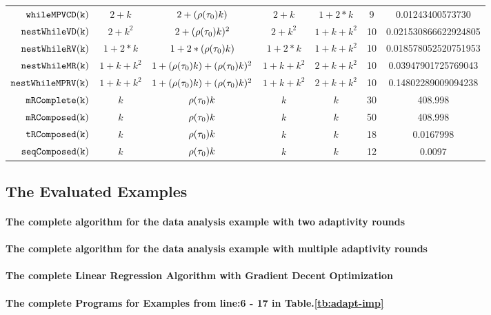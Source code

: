 \begin {table}[H]
\begin{center}
{\begin{tabular}{ r | c | c | c | c | c | c }
         $  \mathtt{whileMPVCD(k)}$ & $2 + k$ & $2 + (\rho(\mathtt{\tau}_0) k)$  & $2 + k$ & $1 + 2 * k$   &   9 & 0.01243400573730 \\
         $  \mathtt{nestWhileVD(k)}$ & $2 + k^2$ & $2 + (\rho(\mathtt{\tau}_0) k)^2$  & $2 + k^2$ & $1 + k + k^2$   &  10 & 0.021530866622924805  \\
         $  \mathtt{nestWhileRV(k)}$ & $1 + 2*k$ & $1 + 2*(\rho(\mathtt{\tau}_0) k)$ & $1 + 2*k$ &  $1 + k + k^2$   &  10 & 0.018578052520751953  \\
         $  \mathtt{nestWhileMR(k)}$ & $1 + k + k^2$ & $1 + (\rho(\mathtt{\tau}_0) k) + (\rho(\mathtt{\tau}_0) k)^2$  & $1 + k + k^2$ &  $2 + k + k^2$  & 10 & 0.03947901725769043  \\
         $  \mathtt{nestWhileMPRV(k)}$ & $1 + k + k^2$ & $1 + (\rho(\mathtt{\tau}_0) k) + (\rho(\mathtt{\tau}_0) k)^2$  & $1 + k + k^2$ &  $2 + k + k^2$  &  10 & 0.14802289009094238  \\
         $  \mathtt{mRComplete(k)}$ & $k$ & $ \rho(\mathtt{\tau}_0) k $ & $k$ & $k$   &  30 & 408.998 \\
         $  \mathtt{mRComposed(k)}$ & $k$ & $ \rho(\mathtt{\tau}_0) k $ & $k$ & $k$   &  50 & 408.998 \\
         $  \mathtt{tRComposed(k)}$ & $k$ & $ \rho(\mathtt{\tau}_0) k $ & $k$ & $k$  &  18 & 0.0167998 \\
         $  \mathtt{seqComposed(k)}$ & $k$ & $ \rho(\mathtt{\tau}_0) k $ & $k$ & $k$  &  12 & 0.0097
        \end{tabular}
}        
\end{center}
\end{table}
%
 \subsection{The Evaluated Examples}  
 \paragraph{The complete algorithm for the data analysis example with two adaptivity rounds} 
 
 \paragraph{The complete algorithm for the data analysis example with multiple adaptivity rounds} 
 
\paragraph{The complete Linear Regression Algorithm with Gradient Decent Optimization}

\paragraph*{The complete Programs for Examples from line:6 - 17 in Table.\ref{tb:adapt-imp}}
